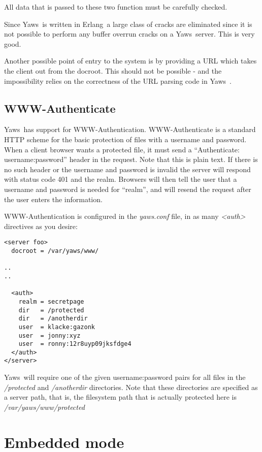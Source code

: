 \documentclass[11pt,oneside,english]{book}
\newcommand{\Erlang}            %
        {{\sc Erlang}}
\newcommand{\Yaws}            %
        {{\sc Yaws}}
\begin{document}
All data that is passed to these two function must be carefully
checked.

Since \Yaws\  is written in \Erlang\  a large class of cracks are
eliminated since it is not possible to perform any buffer overrun
cracks on a \Yaws\  server. This is very good.


Another possible point of entry to the system is by providing a URL
which takes the client out from the docroot. This should not be
possible - and the impossibility relies on the correctness of the URL
parsing code in \Yaws\ .

\section{WWW-Authenticate}
\Yaws\  has support for WWW-Authentication.   WWW-Authenticate is a
standard HTTP scheme for the basic protection of files with a username
and password.  When a client browser wants a protected file, it must send a
``Authenticate: username:password'' header in the request.  Note that
this is plain text.   If there is no such header or the username and
password is invalid the server will respond with status code 401 and
the realm.  Browsers will then tell the user that a username and
password is needed for ``realm'',  and will resend the request after
the user enters the information.

WWW-Authentication is configured in the \textit{yaws.conf} file, in as
many \textit{<auth>} directives as you desire:

\begin{verbatim}
<server foo>
  docroot = /var/yaws/www/

..
..

  <auth>
    realm = secretpage
    dir   = /protected
    dir   = /anotherdir
    user  = klacke:gazonk
    user  = jonny:xyz
    user  = ronny:12r8uyp09jksfdge4
  </auth>
</server>
\end{verbatim}


\Yaws\  will require one of the given username:password pairs for all
files in the \textit{/protected} and \textit{/anotherdir} directories.
Note that these directories are specified as a server path,  that is,
the filesystem path that is actually protected here is
\textit{/var/yaws/www/protected}


\chapter {Embedded mode}
\end{document}

